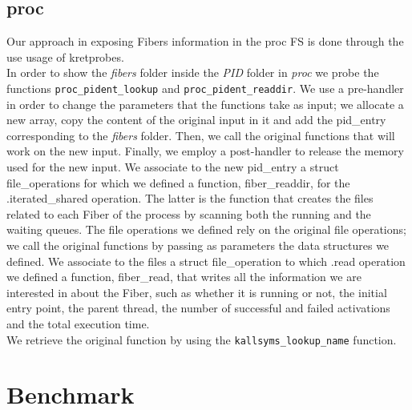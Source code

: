 \documentclass[11pt]{article}
\begin{document}
\subsection{proc}
Our approach in exposing Fibers information in the proc FS is done through the use usage of kretprobes.\\ %
In order to show the \textit{fibers} folder inside the \textit{PID} folder in \textit{proc} we probe the functions \texttt{proc\_pident\_lookup} and \texttt{proc\_pident\_readdir}. We use a pre-handler in order to change the parameters that the functions take as input; we allocate a new array, copy the content of the original input in it and add the pid\_entry corresponding to the \textit{fibers} folder. Then, we call the original functions that will work on the new input. Finally, we employ a post-handler to release the memory used for the new input. We associate to the new pid\_entry a struct file\_operations for which we defined a function, fiber\_readdir, for the .iterated\_shared operation. The latter is the function that creates the files related to each Fiber of the process by scanning both the running and the waiting queues. The file operations we defined rely on the original file operations; we call the original functions by passing as parameters the data structures we defined. We associate to the files a struct file\_operation to which .read operation we defined a function, fiber\_read, that writes all the information we are interested in about the Fiber, such as whether it is running or not, the initial entry point, the parent thread, the number of successful and failed activations and the total execution time.\\
We retrieve the original function by using the \texttt{kallsyms\_lookup\_name} function.

\section{Benchmark}
\end{document}

